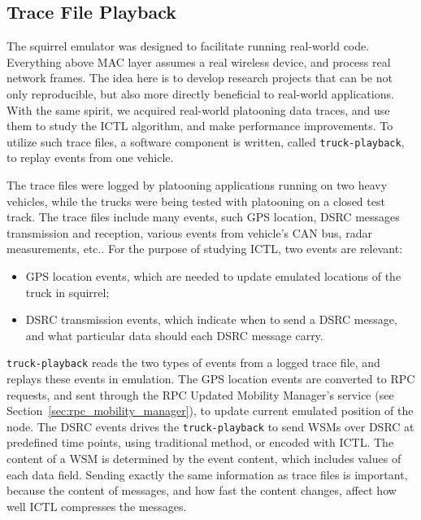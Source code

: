 \documentclass[12pt]{report}
\begin{document}
\subsection{Trace File Playback}
\label{sec:truck_playback}

The squirrel emulator was designed to facilitate running real-world code. Everything above MAC layer assumes a real wireless device, and process real network frames. The idea here is to develop research projects that can be not only reproducible, but also more directly beneficial to real-world applications. With the same spirit, we acquired real-world platooning data traces, and use them to study the ICTL algorithm, and make performance improvements. To utilize such trace files, a software component is written, called \texttt{truck-playback}, to replay events from one vehicle.

The trace files were logged by platooning applications running on two heavy vehicles, while the trucks were being tested with platooning on a closed test track. The trace files include many events, such GPS location, DSRC messages transmission and reception, various events from vehicle's CAN bus, radar measurements, etc.. For the purpose of studying ICTL, two events are relevant:

\begin{itemize}
  \item GPS location events, which are needed to update emulated locations of the truck in squirrel;
  \item DSRC transmission events, which indicate when to send a DSRC message, and what particular data should each DSRC message carry.
\end{itemize}

\texttt{truck-playback} reads the two types of events from a logged trace file, and replays these events in emulation. The GPS location events are converted to RPC requests, and sent through the RPC Updated Mobility Manager's service (see Section~\ref{sec:rpc_mobility_manager}), to update current emulated position of the node. The DSRC events drives the \texttt{truck-playback} to send WSMs over DSRC at predefined time points, using traditional method, or encoded with ICTL. The content of a WSM is determined by the event content, which includes values of each data field. Sending exactly the same information as trace files is important, because the content of messages, and how fast the content changes, affect how well ICTL compresses the messages.
\end{document}
